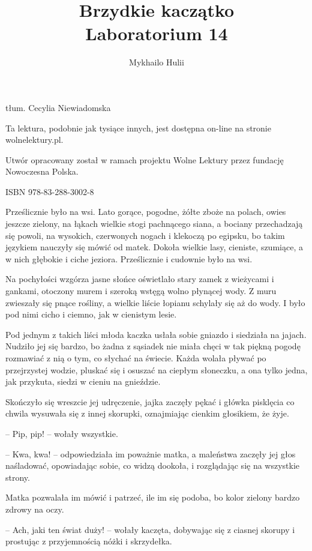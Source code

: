 \documentclass{book}
\author{Mykhailo Hulii}
\title{Brzydkie kaczątko \\ Laboratorium 14}
\begin{document}
\frontmatter
\maketitle
\begin{center}
tłum. Cecylia Niewiadomska

Ta lektura, podobnie jak tysiące innych, jest dostępna on-line na stronie wolnelektury.pl.

Utwór opracowany został w ramach projektu Wolne Lektury przez fundację Nowoczesna Polska.

ISBN 978-83-288-3002-8
\end{center}

\mainmatter

Prześlicznie było na wsi. Lato gorące, pogodne, żółte zboże na polach, owies jeszcze zielony, na łąkach wielkie stogi pachnącego siana, a bociany przechadzają się powoli, na wysokich, czerwonych nogach i klekoczą po egipsku, bo takim językiem nauczyły się mówić od matek. Dokoła wielkie lasy, cieniste, szumiące, a w nich głębokie i ciche jeziora. Prześlicznie i cudownie było na wsi.

Na pochyłości wzgórza jasne słońce oświetlało stary zamek z wieżycami i gankami, otoczony murem i szeroką wstęgą wolno płynącej wody. Z muru zwieszały się pnące rośliny, a wielkie liście łopianu schylały się aż do wody. I było pod nimi cicho i ciemno, jak w cienistym lesie.

Pod jednym z takich liści młoda kaczka usłała sobie gniazdo i siedziała na jajach. Nudziło jej się bardzo, bo żadna z sąsiadek nie miała chęci w tak piękną pogodę rozmawiać z nią o tym, co słychać na świecie. Każda wolała pływać po przejrzystej wodzie, pluskać się i osuszać na ciepłym słoneczku, a ona tylko jedna, jak przykuta, siedzi w cieniu na gnieździe.

Skończyło się wreszcie jej udręczenie, jajka zaczęły pękać i główka pisklęcia co chwila wysuwała się z innej skorupki, oznajmiając cienkim głosikiem, że żyje.

-- Pip, pip! -- wołały wszystkie.

-- Kwa, kwa! -- odpowiedziała im poważnie matka, a maleństwa zaczęły jej głos naśladować, opowiadając sobie, co widzą dookoła, i rozglądając się na wszystkie strony.


Matka pozwalała im mówić i patrzeć, ile im się podoba, bo kolor zielony bardzo zdrowy na oczy.

-- Ach, jaki ten świat duży! -- wołały kaczęta, dobywając się z ciasnej skorupy i prostując z przyjemnością nóżki i skrzydełka.
\end{document}
